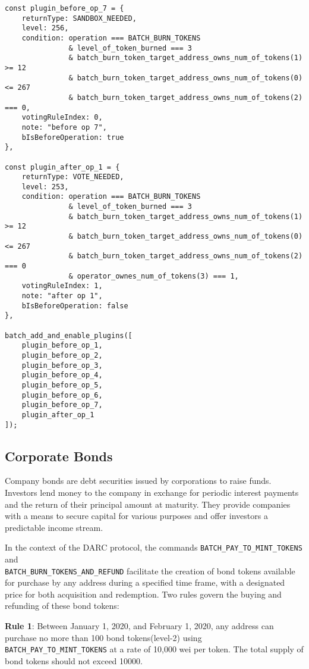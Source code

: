 \documentclass[main.tex]{subfiles}
\begin{document}
\begin{verbatim}
const plugin_before_op_7 = {
    returnType: SANDBOX_NEEDED,
    level: 256, 
    condition: operation === BATCH_BURN_TOKENS
               & level_of_token_burned === 3
               & batch_burn_token_target_address_owns_num_of_tokens(1) >= 12
               & batch_burn_token_target_address_owns_num_of_tokens(0) <= 267
               & batch_burn_token_target_address_owns_num_of_tokens(2) === 0,
    votingRuleIndex: 0, 
    note: "before op 7",
    bIsBeforeOperation: true  
},

const plugin_after_op_1 = {
    returnType: VOTE_NEEDED,
    level: 253, 
    condition: operation === BATCH_BURN_TOKENS
               & level_of_token_burned === 3
               & batch_burn_token_target_address_owns_num_of_tokens(1) >= 12
               & batch_burn_token_target_address_owns_num_of_tokens(0) <= 267
               & batch_burn_token_target_address_owns_num_of_tokens(2) === 0 
               & operator_ownes_num_of_tokens(3) === 1,
    votingRuleIndex: 1, 
    note: "after op 1",
    bIsBeforeOperation: false  
},

batch_add_and_enable_plugins([
    plugin_before_op_1,
    plugin_before_op_2,
    plugin_before_op_3,
    plugin_before_op_4,
    plugin_before_op_5,
    plugin_before_op_6,
    plugin_before_op_7,
    plugin_after_op_1
]);
\end{verbatim}

\subsection{Corporate Bonds}


Company bonds are debt securities issued by corporations to raise funds. Investors lend money to the company in exchange for periodic interest payments and the return of their principal amount at maturity. They provide companies with a means to secure capital for various purposes and offer investors a predictable income stream.

In the context of the DARC protocol, the commands \texttt{BATCH\_PAY\_TO\_MINT\_TOKENS} and \\ \texttt{BATCH\_BURN\_TOKENS\_AND\_REFUND} facilitate the creation of bond tokens available for purchase by any address during a specified time frame, with a designated price for both acquisition and redemption. Two rules govern the buying and refunding of these bond tokens:

\textbf{Rule 1}: Between January 1, 2020, and February 1, 2020, any address can purchase no more than 100 bond tokens(level-2) using \texttt{BATCH\_PAY\_TO\_MINT\_TOKENS} at a rate of 10,000 wei per token. The total supply of bond tokens should not exceed 10000.
\end{document}
